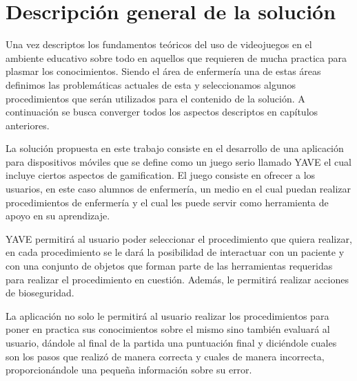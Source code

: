\section{Descripción general de la solución}

Una vez descriptos los fundamentos teóricos del uso de videojuegos en el ambiente educativo sobre todo en aquellos que requieren de mucha practica para plasmar los conocimientos. Siendo el área de enfermería una de estas áreas definimos las problemáticas actuales de esta y seleccionamos algunos procedimientos que serán utilizados para el contenido de la solución. A continuación se busca converger todos los aspectos descriptos en
capítulos anteriores.

La solución propuesta en este trabajo consiste en el desarrollo de una aplicación para dispositivos móviles que se define como un juego serio llamado YAVE el cual incluye ciertos aspectos de gamification. El juego consiste en ofrecer a los usuarios, en este caso alumnos de enfermería, un medio en el cual puedan realizar procedimientos de enfermería y el cual les puede servir como herramienta de apoyo en su aprendizaje.

YAVE permitirá al usuario poder seleccionar el procedimiento que quiera realizar, en cada procedimiento se le dará la posibilidad de interactuar con un paciente y con una conjunto de objetos que forman parte de las herramientas requeridas para realizar el procedimiento en cuestión. Además, le permitirá realizar acciones de bioseguridad.

La aplicación no solo le permitirá al usuario realizar los procedimientos para poner en practica sus conocimientos sobre el mismo sino también evaluará al usuario, dándole al final de la partida una puntuación final y diciéndole cuales son los pasos que realizó de manera correcta y cuales de manera incorrecta, proporcionándole una pequeña información sobre su error.